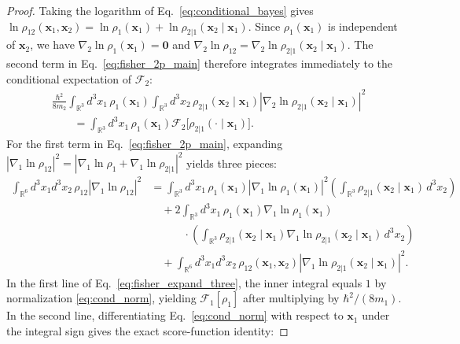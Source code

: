 \documentclass[11pt, a4paper]{article}
\theoremstyle{definition}
\begin{document}
\begin{proof}
Taking the logarithm of Eq.~\eqref{eq:conditional_bayes} gives $\ln\rho_{12}(\mathbf{x}_1, \mathbf{x}_2) = \ln\rho_1(\mathbf{x}_1) + \ln\rho_{2|1}(\mathbf{x}_2 \mid \mathbf{x}_1)$. Since $\rho_1(\mathbf{x}_1)$ is independent of $\mathbf{x}_2$, we have $\nabla_2 \ln\rho_1(\mathbf{x}_1) = \mathbf{0}$ and $\nabla_2 \ln\rho_{12} = \nabla_2 \ln\rho_{2|1}(\mathbf{x}_2 \mid \mathbf{x}_1)$. The second term in Eq.~\eqref{eq:fisher_2p_main} therefore integrates immediately to the conditional expectation of $\mathcal{F}_2$:
\begin{equation}
\begin{aligned}
&\frac{\hbar^2}{8m_2}\int_{\mathbb{R}^3} d^3x_1\,\rho_1(\mathbf{x}_1)\int_{\mathbb{R}^3} d^3x_2\,\rho_{2|1}(\mathbf{x}_2 \mid \mathbf{x}_1)\left|\nabla_2 \ln\rho_{2|1}(\mathbf{x}_2 \mid \mathbf{x}_1)\right|^2 \\
&\qquad = \int_{\mathbb{R}^3} d^3x_1\,\rho_1(\mathbf{x}_1)\mathcal{F}_2\big[\rho_{2|1}(\cdot \mid \mathbf{x}_1)\big].
\end{aligned}
\end{equation}
For the first term in Eq.~\eqref{eq:fisher_2p_main}, expanding $|\nabla_1 \ln\rho_{12}|^2 = |\nabla_1 \ln\rho_1 + \nabla_1 \ln\rho_{2|1}|^2$ yields three pieces:
\begin{align}
\int_{\mathbb{R}^6} d^3x_1 d^3x_2\,\rho_{12}\left|\nabla_1 \ln\rho_{12}\right|^2 &= \int_{\mathbb{R}^3} d^3x_1\,\rho_1(\mathbf{x}_1)\left|\nabla_1 \ln\rho_1(\mathbf{x}_1)\right|^2 \left(\int_{\mathbb{R}^3} \rho_{2|1}(\mathbf{x}_2 \mid \mathbf{x}_1)\,d^3x_2\right) \nonumber \\
&\quad + 2\int_{\mathbb{R}^3} d^3x_1\,\rho_1(\mathbf{x}_1)\nabla_1 \ln\rho_1(\mathbf{x}_1) \nonumber \\
&\qquad\quad \cdot \left(\int_{\mathbb{R}^3} \rho_{2|1}(\mathbf{x}_2 \mid \mathbf{x}_1)\nabla_1 \ln\rho_{2|1}(\mathbf{x}_2 \mid \mathbf{x}_1)\,d^3x_2\right) \nonumber \\
&\quad + \int_{\mathbb{R}^6} d^3x_1 d^3x_2\,\rho_{12}(\mathbf{x}_1, \mathbf{x}_2)\left|\nabla_1 \ln\rho_{2|1}(\mathbf{x}_2 \mid \mathbf{x}_1)\right|^2. \label{eq:fisher_expand_three}
\end{align}
In the first line of Eq.~\eqref{eq:fisher_expand_three}, the inner integral equals $1$ by normalization \eqref{eq:cond_norm}, yielding $\mathcal{F}_1[\rho_1]$ after multiplying by $\hbar^2/(8m_1)$. In the second line, differentiating Eq.~\eqref{eq:cond_norm} with respect to $\mathbf{x}_1$ under the integral sign gives the exact score-function identity:

\end{proof}
\end{document}
